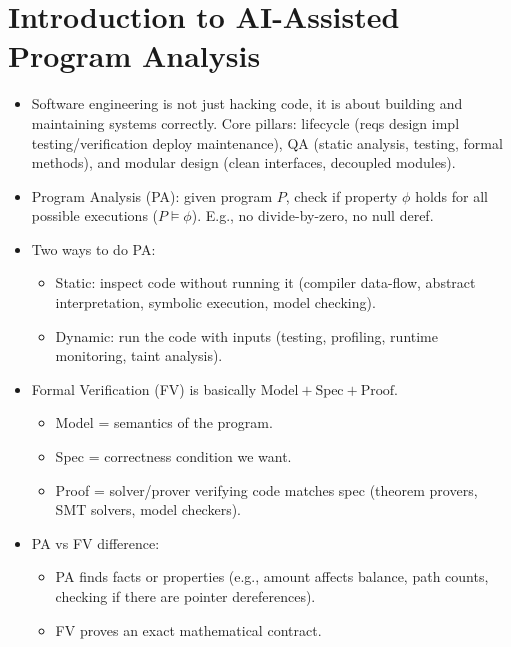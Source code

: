 
\chapter{Introduction to AI-Assisted Program Analysis}

\begin{itemize} \item Software engineering is not just hacking code, it is about
building and maintaining systems correctly. Core pillars: lifecycle (reqs \to
design \to impl \to testing/verification \to deploy \to maintenance), QA (static
analysis, testing, formal methods), and modular design (clean interfaces,
decoupled modules).

\item Program Analysis (PA): given program $P$, check if property $\phi$ holds for all possible executions ($P \models \phi$). E.g., no divide-by-zero, no null deref.

\item Two ways to do PA:
\begin{itemize}
    \item Static: inspect code without running it (compiler data-flow, abstract interpretation, symbolic execution, model checking).
    \item Dynamic: run the code with inputs (testing, profiling, runtime monitoring, taint analysis).
\end{itemize}

\item Formal Verification (FV) is basically $\text{Model} + \text{Spec} + \text{Proof}$.
\begin{itemize}
    \item Model = semantics of the program.
    \item Spec = correctness condition we want.
    \item Proof = solver/prover verifying code matches spec (theorem provers, SMT solvers, model checkers).
\end{itemize}

\item PA vs FV difference:
\begin{itemize}
    \item PA finds facts or properties (e.g., amount affects balance, path counts, checking if there are pointer dereferences).
    \item FV proves an exact mathematical contract.
\end{itemize}

\end{itemize}

